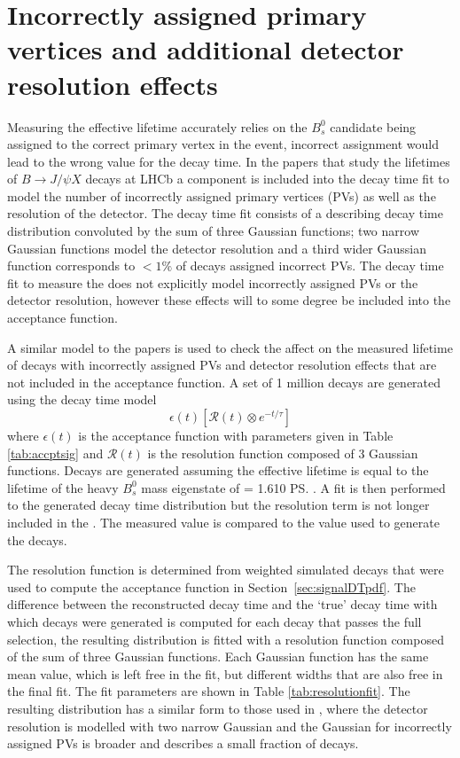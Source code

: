 \section{Incorrectly assigned primary vertices and additional detector resolution effects}
\label{sec:PVcheck}
Measuring the \bsmumu effective lifetime accurately relies on the $B^{0}_{s}$ candidate being assigned to the correct primary vertex in the event, incorrect assignment would lead to the wrong value for the \bs decay time.%
In the papers \cite{Aaij:2016ohx,Aaij:2015vza} that study the lifetimes of $B \to J/\psi X$ decays at LHCb a component is included into the decay time fit to model the number of incorrectly assigned primary vertices (PVs) as well as the resolution of the detector. The decay time fit consists of a \pdf describing decay time distribution convoluted by the sum of three Gaussian functions; two narrow Gaussian functions model the detector resolution  and a third wider Gaussian function corresponds to $<1\%$ of decays assigned incorrect PVs. The decay time fit to measure the \bsmumu \el does not explicitly model incorrectly assigned PVs or the detector resolution, however these effects will to some degree be included into the acceptance function. 

A similar model to the papers \cite{Aaij:2016ohx,Aaij:2015vza} is used to check the affect on the measured lifetime of decays with incorrectly assigned PVs and detector resolution effects that are not included in the acceptance function. A set of 1 million decays are generated using the decay time model 
\begin{equation}
\epsilon (t) [\mathcal{R}(t) \otimes e^{-t/\tau}]
\end{equation}
where $\epsilon (t)$ is the acceptance function with parameters given in Table \ref{tab:accptsig} and $\mathcal{R}(t)$ is the resolution function composed of 3 Gaussian functions. 
Decays are generated assuming the \bsmumu effective lifetime is equal to the lifetime of the heavy $B^{0}_{s}$ mass eigenstate of \tH = 1.610 \ps. A fit is then performed to the generated decay time distribution but  the resolution term is not longer included in the \pdf. The measured \tmumu value is compared to the value used to generate the decays. 


The resolution function is determined from weighted simulated \bsmumu decays that were used to compute the acceptance function in Section~\ref{sec:signalDTpdf}. The difference between the reconstructed decay time and the `true' decay time with which decays were generated is computed for each decay that passes the full selection, the resulting distribution is fitted with a resolution function composed of the sum of three Gaussian functions. Each Gaussian function has the same mean value, which is left free in the fit, but different widths that are also free in the final fit. The fit parameters are shown in Table \ref{tab:resolutionfit}. %
The resulting distribution has a similar form to those used in \cite{Aaij:2016ohx,Aaij:2015vza}, where the detector resolution is modelled with two narrow Gaussian and the Gaussian for incorrectly assigned PVs is broader and describes a small fraction of decays.



